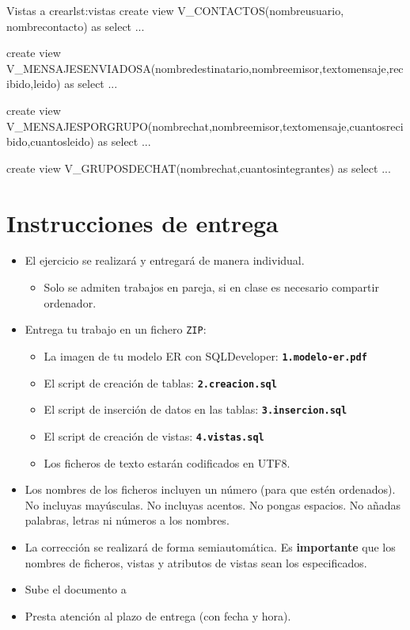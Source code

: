 \begin{homeworkProblem}
\begin{itemize}
  \begin{listadosql}{Vistas a crear}{lst:vistas}
  create view V_CONTACTOS(nombreusuario, nombrecontacto) as
  select ...
  
  create view V_MENSAJESENVIADOSA(nombredestinatario,nombreemisor,textomensaje,recibido,leido) as
  select ...
  
  create view V_MENSAJESPORGRUPO(nombrechat,nombreemisor,textomensaje,cuantosrecibido,cuantosleido) as
  select ...
    
  create view V_GRUPOSDECHAT(nombrechat,cuantosintegrantes) as
  select ...
\end{listadosql}
    
\end{itemize}

\end{homeworkProblem}

\section{Instrucciones de entrega}
\begin{itemize}
\item El ejercicio se realizará y entregará de manera individual.
  \begin{itemize}
  \item Solo se admiten trabajos en pareja, si en clase es necesario compartir ordenador.
  \end{itemize}
\item Entrega tu trabajo en un fichero \texttt{ZIP}:
  \begin{itemize}
  \item La imagen de tu modelo ER  con SQLDeveloper: \texttt{\textbf{1.modelo-er.pdf}}
  \item El script de creación de tablas: \texttt{\textbf{2.creacion.sql}}
  \item El script de inserción de datos en las tablas: \texttt{\textbf{3.insercion.sql}}
  \item El script de creación de vistas: \texttt{\textbf{4.vistas.sql}}
  \item Los ficheros de texto estarán codificados en UTF8.
  \end{itemize}
\item Los nombres de los ficheros incluyen un número (para que estén ordenados). No incluyas mayúsculas. No incluyas acentos. No pongas espacios. No añadas palabras, letras ni números a los nombres.
  \item La corrección se realizará de forma semiautomática. Es \textbf{importante} que los nombres de ficheros, vistas y atributos de vistas sean los especificados.
\item Sube el documento a 
\item Presta atención al plazo de entrega (con fecha y hora).
  
\end{itemize}





